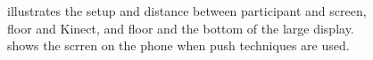 \begin{figure}[H]
\caption{\protect{} illustrates the setup and distance between participant and screen, floor and Kinect, and floor and the bottom of the large display.\protect{} shows the scrren on the phone when push techniques are used.}
\end{figure}